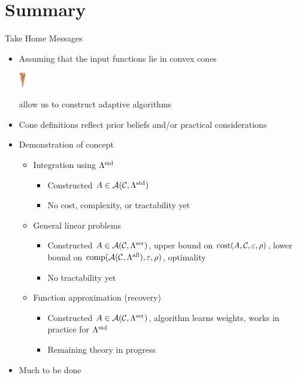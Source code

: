 \documentclass[11pt,compress,xcolor={usenames,dvipsnames},aspectratio=169]{beamer}
\newcommand{\LambdaStd}{\Lambda^{\textup{std}}}
\newcommand{\LambdaSer}{\Lambda^{\textup{ser}}}
\newcommand{\LambdaAll}{\Lambda^{\textup{all}}}
\newcommand{\smallcone}{\parbox{0.65cm}{\includegraphics[width=0.3cm,angle=270]{MediumWaffleCone.eps}}\xspace}
\begin{document}
\section{Summary}
\begin{frame}{Take Home Messages}

\vspace{-4ex}

\begin{itemize}
    \item Assuming that the input functions lie in convex \alert{cones} \smallcone allow us to construct \alert{adaptive} algorithms
    
    \item Cone definitions reflect \alert{prior beliefs} and/or \alert{practical considerations}
    
    \item Demonstration of concept
    \begin{itemize}
        \item Integration using $\LambdaStd$
        \begin{itemize}
            \item Constructed $A \in \ca(\cc,\LambdaStd)$
            \item No cost, complexity, or tractability yet
        \end{itemize}
        \item General linear problems
        \begin{itemize}
            \item Constructed $A \in \ca(\cc,\LambdaSer)$, upper bound on $\operatorname{cost}(A,\mathcal{C},\varepsilon,\rho)$, lower bound on $\comp(\ca(\cc,\LambdaAll),\varepsilon,\rho)$, optimality
            \item No tractability yet
        \end{itemize}
        \item Function approximation (recovery)
        \begin{itemize}
            \item Constructed $A \in \ca(\cc,\LambdaSer)$, algorithm learns weights, works in practice for $\LambdaStd$
            \item Remaining theory in progress
        \end{itemize}
    \end{itemize}
    
    \item Much to be done 
 
\end{itemize}
    
\end{frame}
\end{document}
